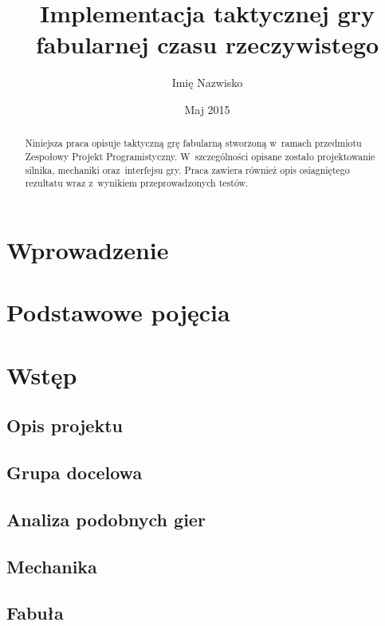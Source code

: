 \documentclass[licencjacka]{pracamgr}
\author	{Imię Nazwisko}
\title{Implementacja taktycznej gry fabularnej czasu rzeczywistego}
\date{Maj 2015}
\begin{document}
\maketitle

\begin{abstract}
  Niniejsza praca opisuje taktyczną grę fabularną stworzoną
  w~ramach przedmiotu Zespołowy Projekt Programistyczny.
  W~szczególności opisane zostało projektowanie silnika,
  mechaniki oraz~interfejsu gry. Praca zawiera również 
  opis osiagniętego rezultatu wraz z~wynikiem przeprowadzonych testów.
\end{abstract}

\tableofcontents

\chapter*{Wprowadzenie}


\chapter{Podstawowe pojęcia}

\chapter{Wstęp}

  \section{Opis projektu}

  \section{Grupa docelowa}
 
  \section{Analiza podobnych gier}
 
  \section{Mechanika}
  
  \section{Fabuła}
  
\end{document}
